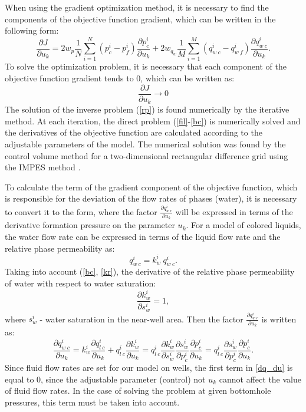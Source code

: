 \documentclass[
11pt,%
tightenlines,%
twoside,%
onecolumn,%
nofloats,%
nobibnotes,%
nofootinbib,%
superscriptaddress,%
noshowpacs,%
centertags]%
{revtex4}
\begin{document}
When using the gradient optimization method, it is necessary to find the components of the objective function gradient, which can be written in the following form:
\begin{equation}
\frac{\partial J}{\partial u_k} = 2w_p\frac{1}{N}\sum_{i=1}^N ({p_c^i-p_f^i})\frac{\partial p_c^i}{\partial u_k}+2w_{q_w}\frac{1}{M}\sum_{i=1}^M{\left(q_{w\:c}^i-q_{w\:f}^i\right)}\frac{\partial q_{w\:c}^i}{\partial u_k}.
\end{equation}
To solve the optimization problem, it is necessary that each component of the objective function gradient tends to 0, which can be written as:
\begin{equation} \label{rp}
	 \frac{\partial J}{\partial u_k} \rightarrow 0
\end{equation}
The solution of the inverse problem (\ref{rp}) is found numerically by the iterative method. At each iteration, the direct problem (\ref{fil}-\ref{bc}) is numerically solved and the derivatives of the objective function are calculated according to the adjustable parameters of the \cite{opt} model. The numerical solution was found by the control volume method for a two-dimensional rectangular difference grid using the IMPES method \cite{azi}.

To calculate the term of the gradient component of the objective function, which is responsible for the deviation of the flow rates of phases (water), it is necessary to convert it to the form, where the factor $\frac{\partial q_{w\:c}^i}{\partial u_k}$ will be expressed in terms of the derivative formation pressure on the parameter $u_k$. For a model of colored liquids, the water flow rate can be expressed in terms of the liquid flow rate and the relative phase permeability as:
 \begin{equation*}
 	q_{w\:c}^i = k_{w}^i \: q_{w\:c}^i.
 \end{equation*}
Taking into account (\ref{bc}, \ref{kr}), the derivative of the relative phase permeability of water with respect to water saturation:
 \begin{equation*}
	\frac{\partial k_{w}^i}{\partial s_w^i} = 1,
\end{equation*}
where $s_w^i$ - water saturation in the near-well area.
Then the factor $\frac{\partial q_{w\:c}^i}{\partial u_k}$ is written as:
\begin{equation} \label{dq_du}
\frac{\partial q_{w\:c}^i}{\partial u_k} = k_{w}^i \frac{\partial q_{l\:c}^i}{\partial u_k} + q_{l\:c}^i \frac{\partial k_{w}^i}{\partial u_k} = q_{l\:c}^i \frac{\partial k_{w}^i}{\partial s_w^i} \frac{\partial s_w^i}{\partial p_c^i}\frac{\partial p_c^i}{\partial u_k} =  q_{l\:c}^i  \frac{\partial s_w^i}{\partial p_c^i}\frac{\partial p_c^i}{\partial u_k}.
\end{equation}
Since fluid flow rates are set for our model on wells, the first term in \ref{dq_du} is equal to 0, since the adjustable parameter (control) not $u_k$ cannot affect the value of fluid flow rates. In the case of solving the problem at given bottomhole pressures, this term must be taken into account.
\end{document}
